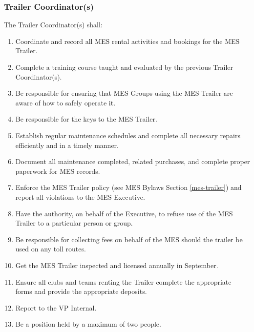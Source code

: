 
\subsubsection{Trailer Coordinator(s)}
\label{trailer-coordinators}
The Trailer Coordinator(s) shall:

\begin{enumerate}
 \item
  Coordinate and record all MES rental activities and bookings for the MES Trailer.
 \item
  Complete a training course taught and evaluated by the previous Trailer Coordinator(s).
 \item
  Be responsible for ensuring that MES Groups using the MES Trailer are aware of how to safely operate it.
 \item
  Be responsible for the keys to the MES Trailer. 
 \item
  Establish regular maintenance schedules and complete all necessary repairs efficiently and in a timely manner.
 \item
  Document all maintenance completed, related purchases, and complete proper paperwork for MES records.
 \item
  Enforce the MES Trailer policy (see MES Bylaws Section \ref{mes-trailer}) and report all violations to the MES Executive.
 \item
  Have the authority, on behalf of the Executive, to refuse use of the MES Trailer to a particular person or group.
 \item
  Be responsible for collecting fees on behalf of the MES should the trailer be used on any toll routes.
 \item
  Get the MES Trailer inspected and licensed annually in September.
 \item
  Ensure all clubs and teams renting the Trailer complete the appropriate forms and provide the appropriate deposits.
 \item
  Report to the VP Internal.
 \item
  Be a position held by a maximum of two people.

\end{enumerate}